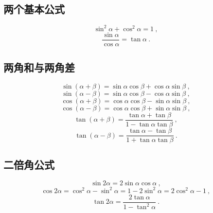 
\begin{issues}
\issueDraft
{}
\end{issues}

\subsection{两个基本公式}
\begin{equation}
\sin^2\alpha + \cos^2\alpha = 1~,
\end{equation}
\begin{equation}
\frac{\sin\alpha}{\cos\alpha} = \tan\alpha~.
\end{equation}

\subsection{两角和与两角差}
\begin{equation}\label{eq_HsAnTf_5}
\sin(\alpha + \beta) = \sin\alpha \cos\beta + \cos\alpha \sin\beta~,
\end{equation}
\begin{equation}\label{eq_HsAnTf_6}
\sin(\alpha - \beta) = \sin\alpha \cos\beta - \cos\alpha \sin\beta~,
\end{equation}
\begin{equation}\label{eq_HsAnTf_4}
\cos(\alpha + \beta) = \cos\alpha \cos\beta - \sin\alpha \sin\beta~,
\end{equation}
\begin{equation}\label{eq_HsAnTf_3}
\cos(\alpha - \beta) = \cos\alpha \cos\beta + \sin\alpha \sin\beta~,
\end{equation}
\begin{equation}\label{eq_HsAnTf_7}
\tan(\alpha + \beta) = \frac{\tan\alpha+\tan\beta}{1-\tan\alpha \tan\beta}~,
\end{equation}
\begin{equation}\label{eq_HsAnTf_8}
\tan(\alpha - \beta) = \frac{\tan\alpha - \tan\beta}{1+\tan\alpha \tan\beta}~.
\end{equation}

\subsection{二倍角公式}
\begin{equation}
\sin2\alpha = 2\sin\alpha \cos\alpha ~,
\end{equation}
\begin{equation}
\cos2\alpha = \cos^2\alpha - \sin^2\alpha = 1 - 2\sin^2\alpha = 2\cos^2\alpha -1~,
\end{equation}
\begin{equation}
\tan2\alpha = \frac{2\tan\alpha}{1-\tan^2\alpha}~.
\end{equation}

